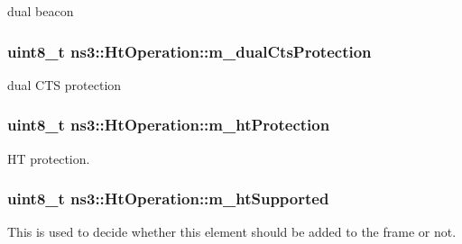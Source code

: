 dual beacon 

\subsubsection[{\texorpdfstring{m\+\_\+dual\+Cts\+Protection}{m_dualCtsProtection}}]{\setlength{\rightskip}{0pt plus 5cm}uint8\+\_\+t ns3\+::\+Ht\+Operation\+::m\+\_\+dual\+Cts\+Protection\hspace{0.3cm}{\ttfamily [private]}}\hypertarget{classns3_1_1HtOperation_aa6ea2c1dd5440e6a00aca5a28554550d}{}\label{classns3_1_1HtOperation_aa6ea2c1dd5440e6a00aca5a28554550d}


dual C\+TS protection 

\subsubsection[{\texorpdfstring{m\+\_\+ht\+Protection}{m_htProtection}}]{\setlength{\rightskip}{0pt plus 5cm}uint8\+\_\+t ns3\+::\+Ht\+Operation\+::m\+\_\+ht\+Protection\hspace{0.3cm}{\ttfamily [private]}}\hypertarget{classns3_1_1HtOperation_aeb7ef7d820bbb26c46ca3ca7dc91845e}{}\label{classns3_1_1HtOperation_aeb7ef7d820bbb26c46ca3ca7dc91845e}


HT protection. 

\subsubsection[{\texorpdfstring{m\+\_\+ht\+Supported}{m_htSupported}}]{\setlength{\rightskip}{0pt plus 5cm}uint8\+\_\+t ns3\+::\+Ht\+Operation\+::m\+\_\+ht\+Supported\hspace{0.3cm}{\ttfamily [private]}}\hypertarget{classns3_1_1HtOperation_a2da7e0e5215ffaf8589ba4ba6676a864}{}\label{classns3_1_1HtOperation_a2da7e0e5215ffaf8589ba4ba6676a864}


This is used to decide whether this element should be added to the frame or not. 

